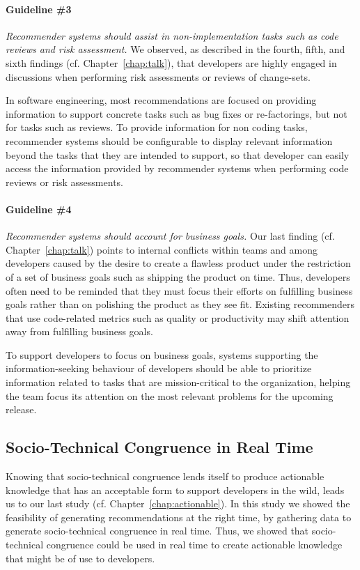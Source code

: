 \paragraph{Guideline \#3} \emph{Recommender systems should assist in non-implementation tasks such as code reviews and risk assessment.} 
We observed, as described in the fourth, fifth, and sixth findings  (cf. Chapter~\ref{chap:talk}), that developers are highly engaged in discussions when performing risk assessments or reviews of change-sets. 

In software engineering, most recommendations are focused on providing information to support concrete tasks such as bug fixes or re-factorings, but not for tasks such as reviews. To provide information for non coding tasks, recommender systems should be configurable to display relevant information beyond the tasks that they are intended to support, so that developer can easily access the information provided by recommender systems when performing code reviews or risk assessments.

\paragraph{Guideline \#4} \emph{Recommender systems should account for business goals.}
Our last finding (cf. Chapter~\ref{chap:talk}) points to internal conflicts within teams and among developers caused by the desire to create a flawless product under the restriction of a set of business goals such as shipping the product on time.
Thus, developers often need to be reminded that they must focus their efforts on fulfilling business goals rather than on polishing the product as they see fit. Existing recommenders that use code-related metrics such as quality or productivity may shift attention away from fulfilling business goals.

To support developers to focus on business goals, systems supporting the information-seeking behaviour of developers should be able to prioritize information related to tasks that are mission-critical to the organization, helping the team focus its attention on the most relevant problems for the upcoming release.


\subsection{Socio-Technical Congruence in Real Time}
Knowing that socio-technical congruence lends itself to produce actionable knowledge that has an acceptable form to support developers in the wild, leads us to our last study (cf. Chapter~\ref{chap:actionable}).
In this study we showed the feasibility of generating recommendations at the right time, by gathering data to generate socio-technical congruence in real time.
Thus, we showed that socio-technical congruence could be used in real time to create actionable knowledge that might be of use to developers.



